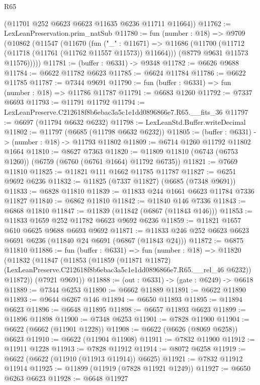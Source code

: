 \begin{lexlean}{R65}
\begin{coremodule}
{      (@11701 @252 @6623 @6623 @11635 @6236 @11711 @11664))
@11762 := LexLeanPreservation.prim_natSub
@11780 := fun (number : @18) =>
  @9709
    (@10862
      (@11547
        (@11670
          (fun ("_" : @11671) =>
          @11686
            (@11700 (@11712 (@11718 (@11761 (@11762 @11557 @11573)) @11664)))
            (@8779 @9631 @11573 @11576)))))
@11781 := (buffer : @6331) -> @9348
@11782 := @6626 @9688
@11784 := @6622 @11782 @6623
@11785 := @6624 @11784
@11786 := @6622 @11785
@11787 := @7344 @9691
@11790 := fun (buffer : @6331) => fun (number : @18) => @11786 @11787
@11791 := @6683 @1260
@11792 := @7337 @6693
@11793 := @11791 @11792
@11794 := LexLeanPreserve.C212618f8b6ebac3a5c1e1dd0896866e7.R65.__fits_36
@11797 := @6697 (@11794 @6632 @6232)
@11798 := LexLeanStd.Buffer.writeDecimal
@11802 := @11797 (@6685 (@11798 @6632 @6232))
@11805 := (buffer : @6331) -> (number : @18) -> @11793 @11802
@11809 := @6714 @1260 @11792 @11802 @1664
@11810 := @8627 @7363
@11820 := @11809 @11810 (@6743 (@6753 @1260)) (@6759 (@6760 (@6761 @1664) @11792 @6735))
@11821 := @7669 @11810
@11825 := @11821 @111 @1662 @11785 @11787
@11827 := @6251 @9692 @6236
@11832 := @11825 (@7337 @11827) (@6685 (@7348 @9691))
@11833 := @6828 @11810
@11839 := @11833 @244 @1661 @6623 @11784 @7336 @11827
@11840 := @6862 @11810
@11842 := @11840 @146 @7336
@11843 := @6868 @11810
@11847 := @11839 (@11842 (@6867 (@11843 @146)))
@11853 := @11833 @1659 @252 @11782 @6623 @9692 @6236
@11859 := @11821 @1657 @610 @6625 @9688 @6693 @9692
@11871 := @11833 @246 @252 @6623 @6623 @6691 @6236 (@11840 @24 @6691 (@6867 (@11843 @24)))
@11872 := @6875 @11810
@11886 := fun (buffer : @6331) =>
  fun (number : @18) =>
  @11820
    (@11832
      (@11847
        (@11853
          (@11859
            (@11871 @11872)
            (LexLeanPreserve.C212618f8b6ebac3a5c1e1dd0896866e7.R65.__rel_46 @6232))
          @11872))
      (@7921 @9691))
@11888 := (out : @6331) -> (gate : @6249) -> @6618
@11889 := @7344 @6253
@11890 := @6662 @11889
@11891 := @6622 @11890
@11893 := @9644 @6267 @146
@11894 := @6650 @11893
@11895 := @11894 @6623
@11896 := @6648 @11895
@11898 := @6657 @11893 @6623
@11899 := @11896 @11898
@11900 := @7348 @6253
@11901 := @7828 @11900
@11904 := @6622 (@6662 (@11901 @1228))
@11908 := @6622 (@6626 (@8069 @6258)) @6623
@11910 := @6622 (@11904 @11908)
@11911 := @7832 @11900
@11912 := @11911 @1228
@11913 := @7828 @11912
@11914 := @8072 @6258
@11919 := @6622 (@6622 (@11910 (@11913 @11914)) @6625)
@11921 := @7832 @11912 @11914
@11925 := @11899 (@11919 (@7828 @11921 @1249))
@11927 := @6650 @6263 @6623
@11928 := @6648 @11927
}
\end{coremodule}
\end{lexlean}
